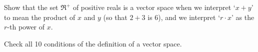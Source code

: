 
\begin{Exercise}[
name={},
title={}, 
difficulty=0,
origin={\cite{JH}}]
Show that the set \( \Re^+ \) of positive reals
is a vector space when we interpret `\( x+y \)' to mean
the product of \( x \) and \( y \) (so that \( 2+3 \) is \( 6 \)),
and we interpret `\( r\cdot x \)' as the \( r \)-th power of \( x \).

\end{Exercise}

\begin{Answer}
Check all 10 conditions of the definition of a vector space.
\end{Answer}
